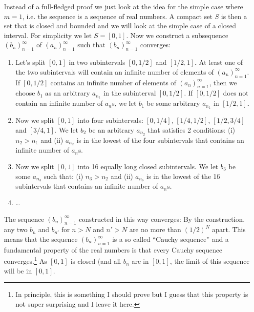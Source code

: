 \documentclass[a4paper,12pt]{article}
\theoremstyle{plain}
\begin{document}
Instead of a full-fledged proof we just look at the idea for the simple case where $m=1$, i.e. the sequence is a sequence of real numbers. A compact set $S$ is then a set that is closed and bounded and we will look at the simple case of a closed interval. For simplicity we let $S=[0,1]$. Now we construct a subsequence $(b_n)_{n=1}^\infty$ of $(a_n)_{n=1}^\infty$ such that $(b_n)_{n=1}^\infty$ converges:\\
\begin{enumerate}
\item Let's split $[0,1]$ in two subintervals $[0,1/2]$ and $[1/2,1]$. At least one of the two subintervals will contain an infinite number of elements of $(a_n)_{n=1}^\infty$. If $[0,1/2]$ contains an infinite number of elements of $(a_n)_{n=1}^\infty$, then we choose $b_1$ as an arbitrary $a_{n_1}$ in the subinterval $[0,1/2]$.  If $[0,1/2]$ does not contain an infinite number of $a_n$s, we let $b_1$ be some arbitrary $a_{n_1}$ in $[1/2,1]$.
\item Now we split $[0,1]$ into four subintervals: $[0,1/4]$, $[1/4,1/2]$, $[1/2,3/4]$ and $[3/4,1]$. We  let $b_2$ be an arbitrary $a_{n_2}$ that satisfies 2 conditions: (i) $n_2>n_1$ and (ii) $a_{n_2}$ is in the lowest of the four subintervals that contains an infinite number of $a_n$s.
\item Now we split $[0,1]$ into 16 equally long closed subintervals. We let $b_3$ be some $a_{n_3}$ such that: (i) $n_3>n_2$ and (ii) $a_{n_3}$ is in the lowest of the 16 subintervals that contains an infinite number of $a_n$s.
\item \dots
\end{enumerate}
The sequence $(b_n)_{n=1}^\infty$ constructed in this way converges: By the construction, any two $b_n$ and $b_{n'}$ for $n>N$ and $n'>N$ are no more than $(1/2)^N$ apart. This means that the sequence $(b_n)_{n=1}^\infty$ is a so called ``Cauchy sequence'' and a fundamental property of the real numbers is that every Cauchy sequence converges.\footnote{In principle, this is something I should prove but I guess that this property is not super surprising and I leave it here.} As $[0,1]$ is closed (and all $b_n$ are in $[0,1]$, the limit of this sequence will be in $[0,1]$.

\end{document}
